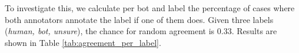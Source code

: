 \documentclass[11pt,a4paper]{article}
\begin{document}


To investigate this, we calculate per bot and label the percentage of cases where both annotators annotate the label if one of them does. Given three labels (\emph{human, bot, unsure}), the chance for random agreement is 0.33. Results are shown in Table \ref{tab:agreement_per_label}.


\end{document}
